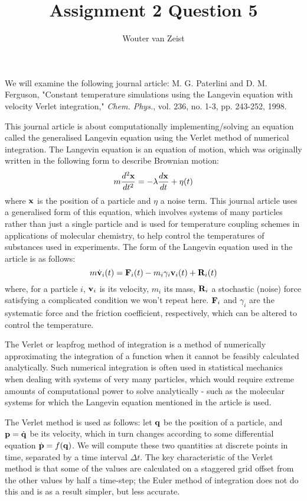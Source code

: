 \documentclass{article}
\title{Assignment 2 Question 5}
\author{Wouter van Zeist}
\date{}
\begin{document}
	\maketitle
	
We will examine the following journal article: M. G. Paterlini and D. M. Ferguson, "Constant temperature simulations using the Langevin equation with velocity Verlet integration," \textit{Chem. Phys.}, vol. 236, no. 1-3, pp. 243-252, 1998.

This journal article is about computationally implementing/solving an equation called the generalised Langevin equation using the Verlet method of numerical integration. The Langevin equation is an equation of motion, which was originally written in the following form to describe Brownian motion:
$$m\frac{d^{2}{\bf x}}{dt^{2}} = -\lambda \frac{d{\bf x}}{dt} + \eta(t)$$
where ${\bf x}$ is the position of a particle and $\eta$ a noise term. This journal article uses a generalised form of this equation, which involves systems of many particles rather than just a single particle and is used for temperature coupling schemes in applications of molecular chemistry, to help control the temperatures of substances used in experiments. The form of the Langevin equation used in the article is as follows:
$$m\dot{\bf v}_{i}(t) = {\bf F}_{i}(t)-m_{i}\gamma_{i}{\bf v}_{i}(t)+{\bf R}_{i}(t)$$
where, for a particle $i$, ${\bf v}_{i}$ is its velocity, $m_{i}$ its mass, ${\bf R}_{i}$ a stochastic (noise) force satisfying a complicated condition we won't repeat here. ${\bf F}_{i}$ and $\gamma_{i}$ are the systematic force and the friction coefficient, respectively, which can be altered to control the temperature.

The Verlet or leapfrog method of integration is a method of numerically approximating the integration of a function when it cannot be feasibly calculated analytically. Such numerical integration is often used in statistical mechanics when dealing with systems of very many particles, which would require extreme amounts of computational power to solve analytically - such as the molecular systems for which the Langevin equation mentioned in the article is used.

The Verlet method is used as follows: let ${\bf q}$ be the position of a particle, and ${\bf p} = \dot{\bf q}$ be its velocity, which in turn changes according to some differential equation $\dot{\bf p} = f({\bf q})$. We will compute these two quantities at discrete points in time, separated by a time interval $\Delta t$. The key characteristic of the Verlet method is that some of the values are calculated on a staggered grid offset from the other values by half a time-step; the Euler method of integration does not do this and is as a result simpler, but less accurate.
\end{document}
